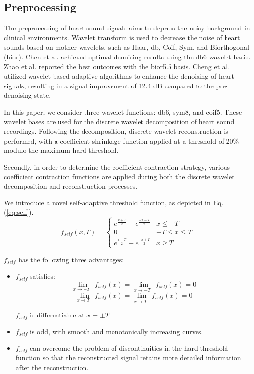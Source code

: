 \subsection{Preprocessing}
The preprocessing of heart sound signals aims to depress the noisy background in clinical environments. Wavelet transform is used to decrease the noise of heart sounds based on mother wavelets, such as Haar, db, Coif, Sym, and Biorthogonal (bior). Chen et al. \cite{2006Research} achieved optimal denoising results using the db6 wavelet basis. Zhao et al. \cite{2010Research} reported the best outcomes with the bior5.5 basis. Cheng et al. \cite{cheng2014denoising} utilized wavelet-based adaptive algorithms to enhance the denoising of heart signals, resulting in a signal improvement of 12.4 dB compared to the pre-denoising state.

In this paper, we consider three wavelet functions: db6, sym8, and coif5. These wavelet bases are used for the discrete wavelet decomposition of heart sound recordings. Following the decomposition, discrete wavelet reconstruction is performed, with a coefficient shrinkage function applied at a threshold of 20\% modulo the maximum hard threshold.

Secondly, in order to determine the coefficient contraction strategy, various coefficient contraction functions are applied during both the discrete wavelet decomposition and reconstruction processes. 

We introduce a novel self-adaptive threshold function, as depicted in Eq.(\ref{eq:self}).
\begin{equation}
f_{self}(x,T)=
	\begin{cases}
	e^{\frac{x+T}{2}}-e^{\frac{-x-T}{2}}&x \leq -T\\ 
	0& -T \leq x \leq T\\
	e^{\frac{x-T}{2}}-e^{\frac{-x+T}{2}}&x \geq T
	\end{cases}
	\label{eq:self}
\end{equation}

$f_{self}$ has the following three advantages:
\begin{itemize}
\item $f_{self}$ satisfies: $$\lim_{x \to -T^-}f_{self}(x)=\lim_{x \to -T^+}f_{self}(x)=0$$ $$\lim_{x \to T^-}f_{self}(x)=\lim_{x \to T^+}f_{self}(x)=0$$ 

$f_{self}$ is differentiable at $x=\pm T$
\item $f_{self}$ is odd, with smooth and monotonically increasing curves.
\item $f_{self}$ can overcome the problem of discontinuities in the hard threshold function so that the reconstructed signal retains more detailed information after the reconstruction.
\end{itemize}

